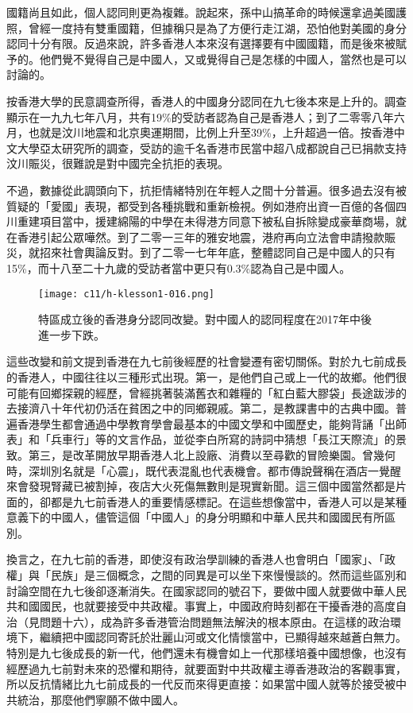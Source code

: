 國籍尚且如此，個人認同則更為複雜。說起來，孫中山搞革命的時候還拿過美國護照，曾經一度持有雙重國籍，但據稱只是為了方便行走江湖，恐怕他對美國的身分認同十分有限。反過來說，許多香港人本來沒有選擇要有中國國籍，而是後來被賦予的。他們覺不覺得自己是中國人，又或覺得自己是怎樣的中國人，當然也是可以討論的。

按香港大學的民意調查所得，香港人的中國身分認同在九七後本來是上升的。調查顯示在一九九七年八月，共有19\%的受訪者認為自己是香港人；到了二零零八年六月，也就是汶川地震和北京奧運期間，比例上升至39\%，上升超過一倍。按香港中文大學亞太研究所的調查，受訪的逾千名香港市民當中超八成都說自己已捐款支持汶川賑災，很難說是對中國完全抗拒的表現。

不過，數據從此調頭向下，抗拒情緒特別在年輕人之間十分普遍。很多過去沒有被質疑的「愛國」表現，都受到各種挑戰和重新檢視。例如港府出資一百億的各個四川重建項目當中，援建綿陽的中學在未得港方同意下被私自拆除變成豪華商場，就在香港引起公眾嘩然。到了二零一三年的雅安地震，港府再向立法會申請撥款賑災，就招來社會輿論反對。到了二零一七年年底，整體認同自己是中國人的只有15\%，而十八至二十九歲的受訪者當中更只有0.3\%認為自己是中國人。

\begin{figure}[htbp]
    \centering
    \texttt{[image: c11/h-klesson1-016.png]}
    \caption{特區成立後的香港身分認同改變。對中國人的認同程度在2017年中後進一步下跌。} 
\end{figure}

這些改變和前文提到香港在九七前後經歷的社會變遷有密切關係。對於九七前成長的香港人，中國往往以三種形式出現。第一，是他們自己或上一代的故鄉。他們很可能有回鄉探親的經歷，曾經挑著裝滿舊衣和雜糧的「紅白藍大膠袋」長途跋涉的去接濟八十年代初仍活在貧困之中的同鄉親戚。第二，是教課書中的古典中國。普遍香港學生都會通過中學教育學會最基本的中國文學和中國歷史，能夠背誦「出師表」和「兵車行」等的文言作品，並從李白所寫的詩詞中猜想「長江天際流」的景致。第三，是改革開放早期香港人北上設廠、消費以至尋歡的冒險樂園。曾幾何時，深圳別名就是「心震」，既代表混亂也代表機會。都市傳說聲稱在酒店一覺醒來會發現腎藏已被割掉，夜店大火死傷無數則是現實新聞。這三個中國當然都是片面的，卻都是九七前香港人的重要情感標記。在這些想像當中，香港人可以是某種意義下的中國人，儘管這個「中國人」的身分明顯和中華人民共和國國民有所區別。

換言之，在九七前的香港，即使沒有政治學訓練的香港人也會明白「國家」、「政權」與「民族」是三個概念，之間的同異是可以坐下來慢慢談的。然而這些區別和討論空間在九七後卻逐漸消失。在國家認同的號召下，要做中國人就要做中華人民共和國國民，也就要接受中共政權。事實上，中國政府時刻都在干擾香港的高度自治（見問題十六），成為許多香港管治問題無法解決的根本原由。在這樣的政治環境下，繼續把中國認同寄託於壯麗山河或文化情懷當中，已顯得越來越蒼白無力。特別是九七後成長的新一代，他們還未有機會如上一代那樣培養中國想像，也沒有經歷過九七前對未來的恐懼和期待，就要面對中共政權主導香港政治的客觀事實，所以反抗情緒比九七前成長的一代反而來得更直接：如果當中國人就等於接受被中共統治，那麼他們寧願不做中國人。

